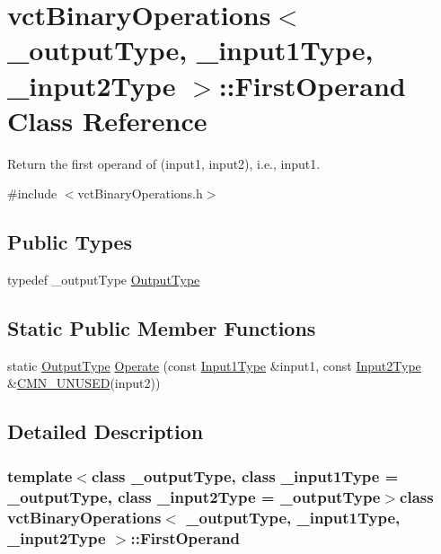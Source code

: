 \hypertarget{classvct_binary_operations_1_1_first_operand}{\section{vct\-Binary\-Operations$<$ \-\_\-output\-Type, \-\_\-input1\-Type, \-\_\-input2\-Type $>$\-:\-:First\-Operand Class Reference}
\label{classvct_binary_operations_1_1_first_operand}
}


Return the first operand of (input1, input2), i.\-e., input1.  




{\ttfamily \#include $<$vct\-Binary\-Operations.\-h$>$}

\subsection*{Public Types}
\begin{DoxyCompactItemize}
\item 
typedef \-\_\-output\-Type \hyperlink{classvct_binary_operations_1_1_first_operand_a236847584897a5c19908da9440b730f2}{Output\-Type}
\end{DoxyCompactItemize}
\subsection*{Static Public Member Functions}
\begin{DoxyCompactItemize}
\item 
static \hyperlink{classvct_binary_operations_1_1_first_operand_a236847584897a5c19908da9440b730f2}{Output\-Type} \hyperlink{classvct_binary_operations_1_1_first_operand_aa777aaab3df319d47dcbc67c95d4d5e5}{Operate} (const \hyperlink{classvct_binary_operations_a5e56a66a012d6a28c539a08a0021c45e}{Input1\-Type} \&input1, const \hyperlink{classvct_binary_operations_a929119af557a04a16b4d854981e49e1b}{Input2\-Type} \&\hyperlink{cmn_portability_8h_a021894e2626935fa2305434b1e893ff6}{C\-M\-N\-\_\-\-U\-N\-U\-S\-E\-D}(input2))
\end{DoxyCompactItemize}


\subsection{Detailed Description}
\subsubsection*{template$<$class \-\_\-output\-Type, class \-\_\-input1\-Type = \-\_\-output\-Type, class \-\_\-input2\-Type = \-\_\-output\-Type$>$class vct\-Binary\-Operations$<$ \-\_\-output\-Type, \-\_\-input1\-Type, \-\_\-input2\-Type $>$\-::\-First\-Operand}

